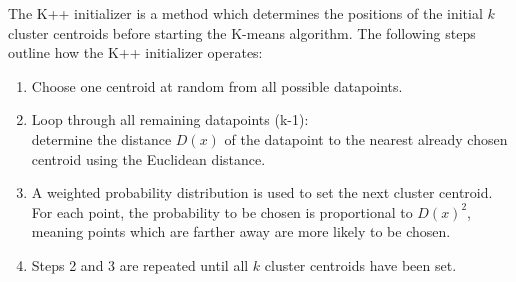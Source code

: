 The K++ initializer is a method which determines the positions of the initial $k$ cluster centroids before starting the K-means algorithm. The following steps outline how the K++ initializer operates:

\begin{enumerate}
	\item Choose one centroid at random from all possible datapoints.
	\item Loop through all remaining datapoints (k-1):\\
	determine the distance $D(x)$ of the datapoint to the nearest already chosen centroid using the Euclidean distance.
	\item A weighted probability distribution is used to set the next cluster centroid. For each point, the probability to be chosen is proportional to $D(x)^2$, meaning points which are farther away are more likely to be chosen.
	\item Steps 2 and 3 are repeated until all $k$ cluster centroids have been set.
	
\end{enumerate}
